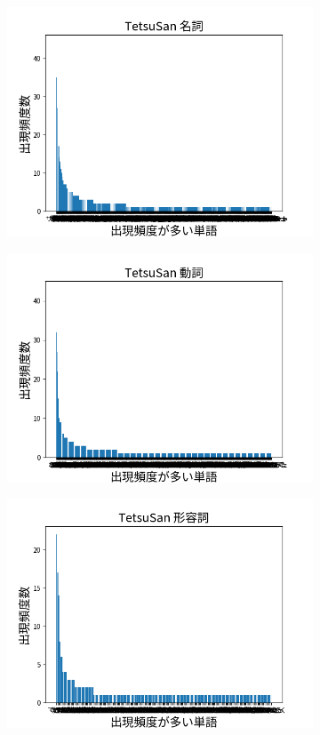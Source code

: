 \documentclass[onecolumn]{ujarticle}   %
\begin{document}
\begin{figure}[hb]
\begin{subfigure}{0.49\columnwidth}
			\includegraphics[width=1.0\columnwidth]{data/meisi_TetsuSan.png}
		\end{subfigure}
		\begin{subfigure}{0.49\columnwidth}
			\centering
			\includegraphics[width=1.0\columnwidth]{data/dousi_TetsuSan.png}
		\end{subfigure}
		\begin{subfigure}{0.49\columnwidth}
			\centering
			\includegraphics[width=1.0\columnwidth]{data/keiyosi_TetsuSan.png}

\end{subfigure}
\end{figure}
\end{document}
